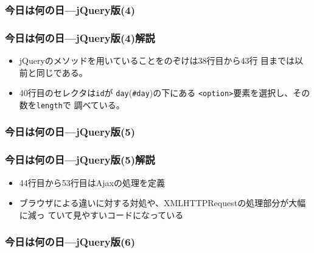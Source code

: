 \begin{frame}[containsverbatim]
 \frametitle{今日は何の日---jQuery版(4)}
 \end{frame}
\begin{frame}[containsverbatim]
 \frametitle{今日は何の日---jQuery版(4)解説}
 \begin{itemize}
  \item jQueryのメソッドを用いていることをのぞけは38行目から43行
	目までは以前と同じである。
  \item 40行目のセレクタは\texttt{id}が
	\texttt{day}(\texttt{\#day})の下にある
	\texttt{<option>}要素を選択し、その数を\texttt{length}で
	調べている。
\end{itemize}
 \end{frame}
\begin{frame}[containsverbatim]
\frametitle{今日は何の日---jQuery版(5)}
 \end{frame}
\begin{frame}[containsverbatim]
\frametitle{今日は何の日---jQuery版(5)解説}
\begin{itemize}
 \item  44行目から53行目はAjaxの処理を定義
 \item ブラウザによる違いに対する対処や、XMLHTTPRequestの処理部分が大幅に減っ
	       ていて見やすいコードになっている
\end{itemize}
 \end{frame}
\begin{frame}[containsverbatim]
\frametitle{今日は何の日---jQuery版(6)}
\end{frame}


